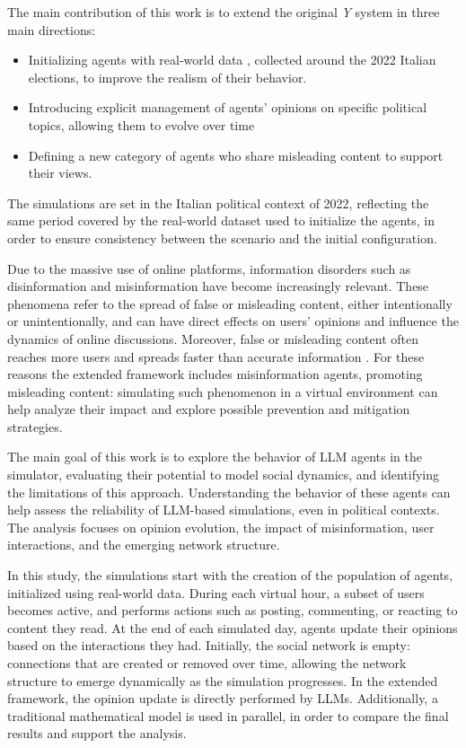The main contribution of this work is to extend the original \textit{Y} system in three main directions:
\begin{itemize}
    \item Initializing agents with real-world data \cite{pierri2023ita}, collected around the 2022 Italian elections, to improve the realism of their behavior.
    \item Introducing explicit management of agents' opinions on specific political topics, allowing them to evolve over time
    \item Defining a new category of agents who share misleading content to support their views.
\end{itemize}

\medskip
The simulations are set in the Italian political context of 2022, reflecting the same period covered by the real-world dataset used to initialize the agents, in order to ensure consistency between the scenario and the initial configuration.

\medskip
Due to the massive use of online platforms, information disorders such as disinformation and misinformation have become increasingly relevant.
These phenomena refer to the spread of false or misleading content, either intentionally or unintentionally, and can have direct effects on users' opinions and influence the dynamics of online discussions.
Moreover, false or misleading content often reaches more users and spreads faster than accurate information \cite{kumar2018falseinformationwebsocial}.
For these reasons the extended framework includes misinformation agents, promoting misleading content: simulating such phenomenon in a virtual environment can help analyze their impact and explore possible prevention and mitigation strategies.

\medskip
The main goal of this work is to explore the behavior of LLM agents in the simulator, evaluating their potential to model social dynamics, and identifying the limitations of this approach.
Understanding the behavior of these agents can help assess the reliability of LLM-based simulations, even in political contexts.
The analysis focuses on opinion evolution, the impact of misinformation, user interactions, and the emerging network structure.


\medskip
In this study, the simulations start with the creation of the population of agents, initialized using real-world data.
During each virtual hour, a subset of users becomes active, and performs actions such as posting, commenting, or reacting to content they read.
At the end of each simulated day, agents update their opinions based on the interactions they had.
Initially, the social network is empty: connections that are created or removed over time, allowing the network structure to emerge dynamically as the simulation progresses.
In the extended framework, the opinion update is directly performed by LLMs.
Additionally, a traditional mathematical model is used in parallel, in order to compare the final results and support the analysis.


